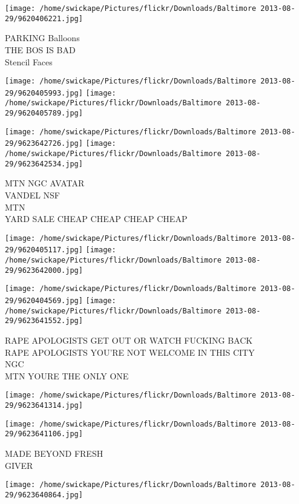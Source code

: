 \documentclass[10pt,letterpaper]{article}
\begin{document}
\vspace{0.25in}
\texttt{[image: /home/swickape/Pictures/flickr/Downloads/Baltimore 2013-08-29/9620406221.jpg]}

PARKING Balloons\\
THE BOS IS BAD\\
Stencil Faces
\pagebreak

\texttt{[image: /home/swickape/Pictures/flickr/Downloads/Baltimore 2013-08-29/9620405993.jpg]}
\texttt{[image: /home/swickape/Pictures/flickr/Downloads/Baltimore 2013-08-29/9620405789.jpg]}

\texttt{[image: /home/swickape/Pictures/flickr/Downloads/Baltimore 2013-08-29/9623642726.jpg]}
\texttt{[image: /home/swickape/Pictures/flickr/Downloads/Baltimore 2013-08-29/9623642534.jpg]}

MTN NGC AVATAR\\
VANDEL NSF\\
MTN\\
YARD SALE CHEAP CHEAP CHEAP CHEAP
\pagebreak

\texttt{[image: /home/swickape/Pictures/flickr/Downloads/Baltimore 2013-08-29/9620405117.jpg]}
\texttt{[image: /home/swickape/Pictures/flickr/Downloads/Baltimore 2013-08-29/9623642000.jpg]}

\texttt{[image: /home/swickape/Pictures/flickr/Downloads/Baltimore 2013-08-29/9620404569.jpg]}
\texttt{[image: /home/swickape/Pictures/flickr/Downloads/Baltimore 2013-08-29/9623641552.jpg]}

RAPE APOLOGISTS GET OUT OR WATCH FUCKING BACK\\
RAPE APOLOGISTS YOU'RE NOT WELCOME IN THIS CITY\\
NGC\\
MTN YOURE THE ONLY ONE
\pagebreak

\texttt{[image: /home/swickape/Pictures/flickr/Downloads/Baltimore 2013-08-29/9623641314.jpg]}

\vspace{0.25in}
\texttt{[image: /home/swickape/Pictures/flickr/Downloads/Baltimore 2013-08-29/9623641106.jpg]}

MADE BEYOND FRESH\\
GIVER
\pagebreak

\texttt{[image: /home/swickape/Pictures/flickr/Downloads/Baltimore 2013-08-29/9623640864.jpg]}
\end{document}
